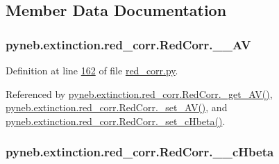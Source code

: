 \begin{DoxyVerb}
\begin{DoxyCode}
\end{DoxyCode}


\subsection{Member Data Documentation}
\hypertarget{classpyneb_1_1extinction_1_1red__corr_1_1_red_corr_a476840870719872a12ab48a0d1f1a839}{
\subsubsection[{\-\_\-\-\_\-\-A\-V}]{\setlength{\rightskip}{0pt plus 5cm}pyneb.\-extinction.\-red\-\_\-corr.\-Red\-Corr.\-\_\-\-\_\-\-A\-V\hspace{0.3cm}{\ttfamily [private]}}}\label{classpyneb_1_1extinction_1_1red__corr_1_1_red_corr_a476840870719872a12ab48a0d1f1a839}


Definition at line \hyperlink{red__corr_8py_source_l00162}{162} of file \hyperlink{red__corr_8py_source}{red\-\_\-corr.\-py}.



Referenced by \hyperlink{red__corr_8py_source_l00154}{pyneb.\-extinction.\-red\-\_\-corr.\-Red\-Corr.\-\_\-get\-\_\-\-A\-V()}, \hyperlink{red__corr_8py_source_l00169}{pyneb.\-extinction.\-red\-\_\-corr.\-Red\-Corr.\-\_\-set\-\_\-\-A\-V()}, and \hyperlink{red__corr_8py_source_l00164}{pyneb.\-extinction.\-red\-\_\-corr.\-Red\-Corr.\-\_\-set\-\_\-c\-Hbeta()}.

\hypertarget{classpyneb_1_1extinction_1_1red__corr_1_1_red_corr_ab91dff40a007dd632c35d98042077f3d}{
\subsubsection[{\-\_\-\-\_\-c\-Hbeta}]{\setlength{\rightskip}{0pt plus 5cm}pyneb.\-extinction.\-red\-\_\-corr.\-Red\-Corr.\-\_\-\-\_\-c\-Hbeta\hspace{0.3cm}{\ttfamily [private]}}}\label{classpyneb_1_1extinction_1_1red__corr_1_1_red_corr_ab91dff40a007dd632c35d98042077f3d}



\end{DoxyVerb}
